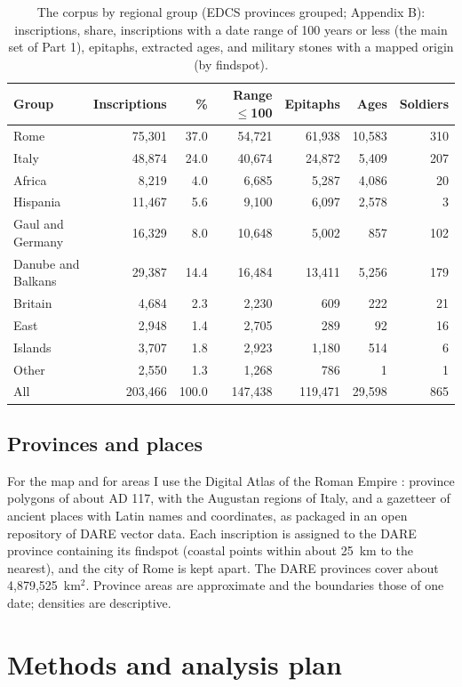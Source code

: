 \documentclass[11pt,a4paper]{article}
\begin{document}
\begin{table}[tbp]\centering\small\caption{The corpus by regional group (EDCS provinces grouped; Appendix B): inscriptions, share, inscriptions with a date range of 100 years or less (the main set of Part 1), epitaphs, extracted ages, and military stones with a mapped origin (by findspot).}\label{tab:corpus}\begin{tabular}{lrrrrrr}\toprule Group & Inscriptions & \% & Range $\leq$100 & Epitaphs & Ages & Soldiers\\\midrule
Rome & 75,301 & 37.0 & 54,721 & 61,938 & 10,583 & 310\\
Italy & 48,874 & 24.0 & 40,674 & 24,872 & 5,409 & 207\\
Africa & 8,219 & 4.0 & 6,685 & 5,287 & 4,086 & 20\\
Hispania & 11,467 & 5.6 & 9,100 & 6,097 & 2,578 & 3\\
Gaul and Germany & 16,329 & 8.0 & 10,648 & 5,002 & 857 & 102\\
Danube and Balkans & 29,387 & 14.4 & 16,484 & 13,411 & 5,256 & 179\\
Britain & 4,684 & 2.3 & 2,230 & 609 & 222 & 21\\
East & 2,948 & 1.4 & 2,705 & 289 & 92 & 16\\
Islands & 3,707 & 1.8 & 2,923 & 1,180 & 514 & 6\\
Other & 2,550 & 1.3 & 1,268 & 786 & 1 & 1\\
\midrule All & 203,466 & 100.0 & 147,438 & 119,471 & 29,598 & 865\\
\bottomrule\end{tabular}\end{table}

\subsection{Provinces and places}
For the map and for areas I use the Digital Atlas of the Roman Empire \citep[DARE;][]{ahlfeldt2013}: province polygons of about AD 117, with the Augustan regions of Italy, and a gazetteer of ancient places with Latin names and coordinates, as packaged in an open repository of DARE vector data. Each inscription is assigned to the DARE province containing its findspot (coastal points within about 25~km to the nearest), and the city of Rome is kept apart. The DARE provinces cover about 4,879,525~km$^2$. Province areas are approximate and the boundaries those of one date; densities are descriptive.

\section{Methods and analysis plan}\label{sec:design}
\end{document}
